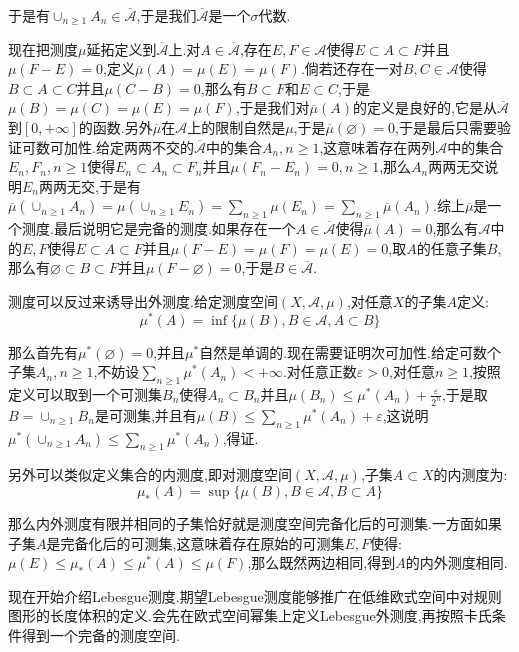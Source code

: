 于是有$\cup_{n\ge1}A_n\in\overline{\mathscr{A}}$,于是我们$\overline{\mathscr{A}}$是一个$\sigma$代数.

现在把测度$\mu$延拓定义到$\overline{\mathscr{A}}$上.对$A\in\overline{\mathscr{A}}$,存在$E,F\in\mathscr{A}$使得$E\subset A\subset F$并且$\mu(F-E)=0$,定义$\overline{\mu}(A)=\mu(E)=\mu(F)$.倘若还存在一对$B,C\in\mathscr{A}$使得$B\subset A\subset C$并且$\mu(C-B)=0$,那么有$B\subset F$和$E\subset C$,于是$\mu(B)=\mu(C)=\mu(E)=\mu(F)$,于是我们对$\overline{\mu}(A)$的定义是良好的,它是从$\overline{\mathscr{A}}$到$[0,+\infty]$的函数.另外$\overline{\mu}$在$\mathscr{A}$上的限制自然是$\mu$,于是$\overline{\mu}(\varnothing)=0$,于是最后只需要验证可数可加性.给定两两不交的$\overline{\mathscr{A}}$中的集合$A_n,n\ge1$,这意味着存在两列$\mathscr{A}$中的集合$E_n,F_n,n\ge1$使得$E_n\subset A_n\subset F_n$并且$\mu(F_n-E_n)=0,n\ge1$,那么$A_n$两两无交说明$E_n$两两无交,于是有$\overline{\mu}(\cup_ {n\ge1}A_n)=\mu(\cup_{n\ge1}E_n)=\sum_{n\ge1}\mu(E_n)=\sum_{n\ge1}\overline{\mu}(A_n)$.综上$\overline{\mu}$是一个测度.最后说明它是完备的测度.如果存在一个$A\in\overline{\mathscr{A}}$使得$\overline{\mu}(A)=0$,那么有$\mathscr{A}$中的$E,F$使得$E\subset A\subset F$并且$\mu(F-E)=\mu(F)=\mu(E)=0$,取$A$的任意子集$B$,那么有$\varnothing\subset B\subset F$并且$\mu(F-\varnothing)=0$,于是$B\in\overline{\mathscr{A}}$.

测度可以反过来诱导出外测度.给定测度空间$(X,\mathscr{A},\mu)$,对任意$X$的子集$A$定义:
$$\mu^*(A)=\inf\{\mu(B),B\in\mathscr{A},A\subset B\}$$

那么首先有$\mu^*(\varnothing)=0$,并且$\mu^*$自然是单调的.现在需要证明次可加性.给定可数个子集$A_n,n\ge1$,不妨设$\sum_ {n\ge1}\mu^*(A_n)<+\infty$.对任意正数$\varepsilon>0$,对任意$n\ge1$,按照定义可以取到一个可测集$B_n$使得$A_n\subset B_n$并且$\mu(B_n)\le\mu^* (A_n)+\frac{\varepsilon}{2^n}$,于是取$B=\cup_{n\ge1}B_n$是可测集,并且有$\mu(B)\le\sum_{n\ge1}\mu^*(A_n)+\varepsilon$,这说明$\mu^* (\cup_{n\ge1}A_n)\le\sum_{n\ge1}\mu^*(A_n)$,得证.

另外可以类似定义集合的内测度,即对测度空间$(X,\mathscr{A},\mu)$,子集$A\subset X$的内测度为:
$$\mu_*(A)=\sup\{\mu(B),B\in\mathscr{A},B\subset A\}$$

那么内外测度有限并相同的子集恰好就是测度空间完备化后的可测集.一方面如果子集$A$是完备化后的可测集,这意味着存在原始的可测集$E,F$使得:$\mu(E)\le\mu_* (A)\le\mu^*(A)\le\mu(F)$,那么既然两边相同,得到$A$的内外测度相同.

现在开始介绍Lebesgue测度.期望Lebesgue测度能够推广在低维欧式空间中对规则图形的长度体积的定义.会先在欧式空间幂集上定义Lebesgue外测度,再按照卡氏条件得到一个完备的测度空间.

